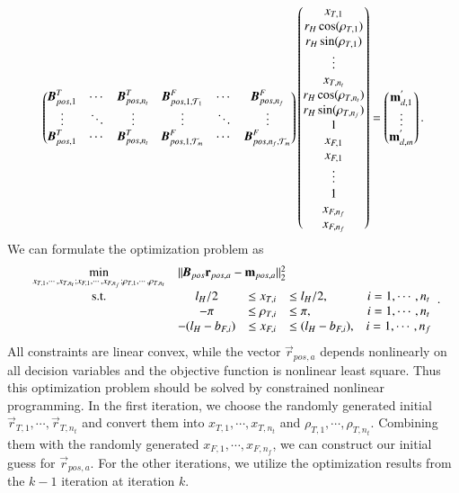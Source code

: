 \begin{align}
\begin{pmatrix}
    \emph{\textbf{B}}_{pos,1}^{T} & \cdots & \emph{\textbf{B}}_{pos,n_{t}}^{T}&
     \emph{\textbf{B}}_{pos,1,\mathcal{T}_{1}}^{F} & \cdots & \emph{\textbf{B}}_{pos,n_{f}}^{F}\\
     \vdots & \ddots & \vdots&\vdots&\ddots&\vdots \\
    \emph{\textbf{B}}_{pos,1}^{T} & \cdots & \emph{\textbf{B}}_{pos,n_{t}}^{T}&
     \emph{\textbf{B}}_{pos,1,\mathcal{T}_{m}}^{F} & \cdots & \emph{\textbf{B}}_{pos,n_{f},\mathcal{T}_{m}}^{F}
\end{pmatrix} 
\begin{pmatrix}
x_{T,1}\\r_{H}\cos(\rho_{T,1})\\r_{H}\sin(\rho_{T,1}) \\ \vdots \\
x_{T,n_{t}}\\r_{H}\cos(\rho_{T,n_{t}})\\r_{H}\sin(\rho_{T,n_{f}})  \\
1\\x_{F,1}\\x_{F,1}\\ \vdots \\ 1\\x_{F,n_{f}}\\x_{F,n_{f}}
\end{pmatrix}=
\begin{pmatrix}
\vec{m}_{d,1}^{'}\\ \vdots \\ \vec{m}_{d,m}^{'}
\end{pmatrix}.
\end{align}
We can formulate the optimization problem as 
\begin{equation}
\begin{array}{ccclcl}
\displaystyle \min_{x_{T,1}, \cdots, x_{T,n_{t}}; x_{F,1}, \cdots, x_{F,n_{f}}; \rho_{T,1}, \cdots, \rho_{T,n_{t}}} & \multicolumn{3}{l}{||\emph{\textbf{B}}_{pos}\vec{r}_{pos,a}-\vec{m}_{pos,a}||^{2}_{2}} \\
\textrm{s.t.}
& l_{H}/2&\leq x_{T,i} & \leq l_{H}/2, &i=1, \cdots, n_{t} \\
& -\pi&\leq \rho_{T,i} & \leq \pi, &i=1, \cdots, n_{t} \\
& -(l_{H}-b_{F,i})&\leq x_{F,i} & \leq (l_{H}-b_{F,i}), &i=1, \cdots, n_{f} 
\end{array}. \label{EQ:OPTPos}
\end{equation}
All constraints are linear convex, while the vector $\vec{r}_{pos,a}$ depends nonlinearly on all decision variables and the objective function is nonlinear least square. Thus this optimization problem should be solved by constrained nonlinear programming. In the first iteration, we choose the randomly generated initial $\vec{r}_{T,1}, \cdots, \vec{r}_{T,n_{t}}$ and convert them into $x_{T,1}, \cdots, x_{T,n_{t}}$ and $\rho_{T,1}, \cdots, \rho_{T,n_{t}}$. Combining them with the randomly generated $x_{F,1}, \cdots, x_{F,n_{f}}$, we can construct our initial guess for $\vec{r}_{pos,a}$. For the other iterations, we utilize the optimization results from the $k-1$ iteration at iteration $k$. 

